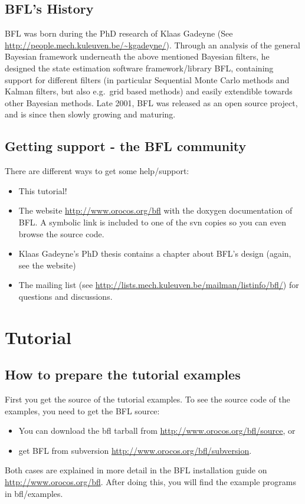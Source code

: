 \documentclass[a4paper,10pt]{report}
\begin{document}
\section{BFL's History}
BFL was born during the PhD research of Klaas Gadeyne (See
\url{http://people.mech.kuleuven.be/~kgadeyne/}).  Through an analysis
of the general Bayesian framework underneath the above mentioned
Bayesian filters, he designed the state estimation software
framework/library BFL, containing support for different filters (in
particular Sequential Monte Carlo methods and Kalman filters, but also
e.g.~grid based methods) and easily extendible towards other Bayesian
methods. Late 2001, BFL was released as an open source project, and is
since then slowly growing and maturing.

\section{Getting support - the BFL community}
There are different ways to get some help/support:
\begin{itemize}
\item This tutorial!
\item The website
  \url{http://www.orocos.org/bfl} with the
  doxygen documentation of BFL. A symbolic link is included to one of
  the svn copies so you can even browse the source code.
\item Klaas Gadeyne's PhD thesis contains a chapter about BFL's design
  (again, see the website)
\item The mailing list (see
  \url{http://lists.mech.kuleuven.be/mailman/listinfo/bfl/}) for
  questions and discussions.
\end{itemize}







\chapter{Tutorial}
\label{chapt:tutorial}
\section{How to prepare the tutorial examples}

First you get the source of the tutorial examples. To see the source
code of the examples, you need to get the BFL source:
\begin{itemize}
\item You can download the bfl tarball from \url{http://www.orocos.org/bfl/source}, or
\item get BFL from subversion \url{http://www.orocos.org/bfl/subversion}.
\end{itemize}
Both cases are explained in more detail in the BFL installation guide on
\url{http://www.orocos.org/bfl}. After doing this, you will find the example
programs in bfl/examples.
\end{document}
